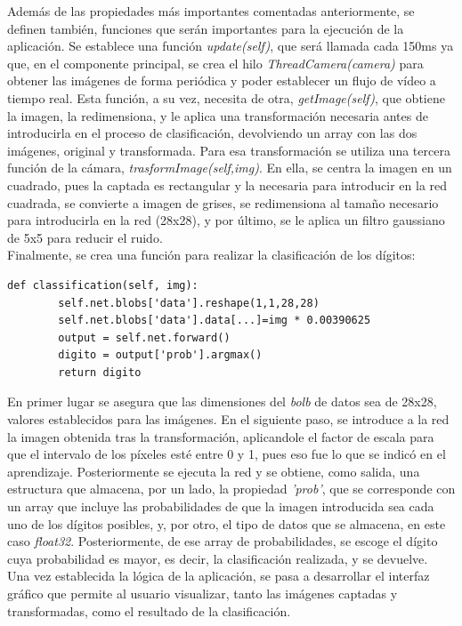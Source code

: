 Además de las propiedades más importantes comentadas anteriormente, se definen también, funciones que serán importantes para la ejecución de la aplicación. Se establece una función \textit{update(self)}, que será llamada cada 150ms ya que, en el componente principal, se crea el hilo \textit{ThreadCamera(camera)} para obtener las imágenes de forma periódica y poder establecer un flujo de vídeo a tiempo real. Esta función, a su vez, necesita de otra, \textit{getImage(self)}, que obtiene la imagen, la redimensiona, y le aplica una transformación necesaria antes de introducirla en el proceso de clasificación, devolviendo un array con las dos imágenes, original y transformada. Para esa transformación se utiliza una tercera función de la cámara, \textit{trasformImage(self,img)}. En ella, se centra la imagen en un cuadrado, pues la captada es rectangular y la necesaria para introducir en la red cuadrada, se convierte a imagen de grises, se redimensiona al tamaño necesario para introducirla en la red (28x28), y por último, se le aplica un filtro gaussiano de 5x5 para reducir el ruido.\\

Finalmente, se crea una función para realizar la clasificación de los dígitos:
\vspace{10pt}
\begin{lstlisting}[frame=single]
	def classification(self, img):
		self.net.blobs['data'].reshape(1,1,28,28)
		self.net.blobs['data'].data[...]=img * 0.00390625
		output = self.net.forward()
		digito = output['prob'].argmax()
		return digito
\end{lstlisting}
En primer lugar se asegura que las dimensiones del \textit{bolb} de datos sea de 28x28, valores establecidos para las imágenes. En el siguiente paso, se introduce a la red la imagen obtenida tras la transformación, aplicandole el factor de escala para que el intervalo de los píxeles esté entre 0 y 1, pues eso fue lo que se indicó en el aprendizaje. Posteriormente se ejecuta la red y se obtiene, como salida, una estructura que almacena, por un lado, la propiedad \textit{'prob'}, que se corresponde con un array que incluye las probabilidades de que la imagen introducida sea cada uno de los dígitos posibles, y, por otro, el tipo de datos que se almacena, en este caso \textit{float32}. Posteriormente, de ese array de probabilidades, se escoge el dígito cuya probabilidad es mayor, es decir, la clasificación realizada, y se devuelve.\\

Una vez establecida la lógica de la aplicación, se pasa a desarrollar el interfaz gráfico que permite al usuario visualizar, tanto las imágenes captadas y transformadas, como el resultado de la clasificación.
